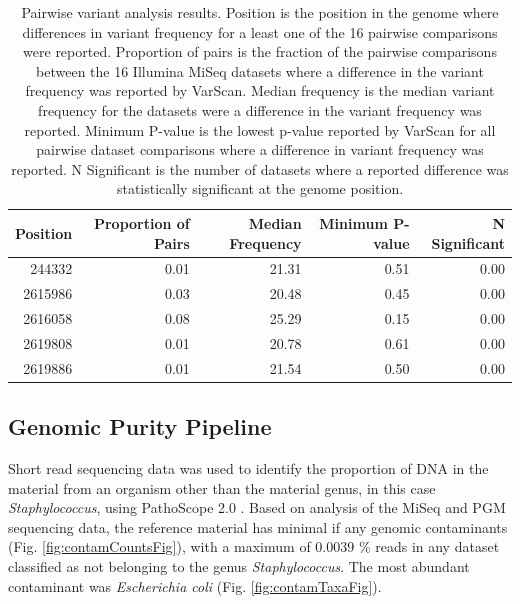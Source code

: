 \documentclass[smallextended]{svjour3}\usepackage[]{graphicx}\usepackage[]{color}
\begin{document}
\begin{table}[ht]
\centering
\begin{tabular}{rrrrr}
  \hline
Position & Proportion of Pairs & Median Frequency & Minimum P-value & N Significant \\ 
  \hline
244332 & 0.01 & 21.31 & 0.51 & 0.00 \\ 
  2615986 & 0.03 & 20.48 & 0.45 & 0.00 \\ 
  2616058 & 0.08 & 25.29 & 0.15 & 0.00 \\ 
  2619808 & 0.01 & 20.78 & 0.61 & 0.00 \\ 
  2619886 & 0.01 & 21.54 & 0.50 & 0.00 \\ 
   \hline
\end{tabular}
\caption{Pairwise variant analysis results. Position is the position in the genome where differences in variant frequency for a least one of the 16 pairwise comparisons were reported. Proportion of pairs is the fraction of the pairwise comparisons between the 16 Illumina MiSeq datasets where a difference in the variant frequency was reported by VarScan. Median frequency is the median variant frequency for the datasets were a difference in the variant frequency was reported. Minimum P-value is the lowest p-value reported by VarScan for all pairwise dataset comparisons where a difference in variant frequency was reported. N Significant is the number of datasets where a reported difference was statistically significant at the genome position.} 
\label{Table:homogeneityTable}
\end{table}



\subsection{Genomic Purity Pipeline}
Short read sequencing data was used to identify the proportion of DNA in the material from an organism other than the material genus, in this case \textit{Staphylococcus}, using PathoScope 2.0 \cite{Hong2014} . Based on analysis of the MiSeq and PGM sequencing data, the reference material has minimal if any genomic contaminants (Fig. \ref{fig:contamCountsFig}), with a maximum of 0.0039 \% reads in any dataset classified as not belonging to the genus \textit{Staphylococcus}. The most abundant contaminant was \textit{Escherichia coli} (Fig. \ref{fig:contamTaxaFig}).  
\end{document}
